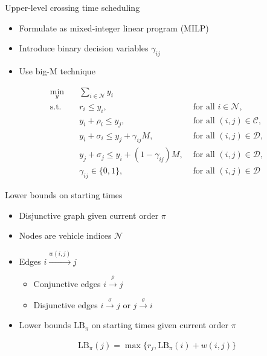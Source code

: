 \documentclass[bigger]{beamer}
\begin{document}
\begin{frame}[label={sec:orgc9e3197}]{Upper-level crossing time scheduling}
\begin{itemize}
\item Formulate as mixed-integer linear program (MILP)
\item Introduce binary decision variables \(\gamma_{ij}\)
\item Use big-M technique
\end{itemize}

\footnotesize
\begin{align*}
  \min_{y} \quad & \sum_{i \in \mathcal{N}} y_{i} & \\
  \text{s.t.} \quad & r_{i} \leq y_{i}, & \text{ for all } i \in \mathcal{N} , \\
  & y_{i} + \rho_{i} \leq y_{j}, & \text{ for all } (i,j) \in \mathcal{C} , \label{eq:conjunctions} \\
  & y_{i} + \sigma_{i} \leq y_{j} + \gamma_{ij}M, & \text{ for all } (i,j) \in {\mathcal{D}} , \\
  & y_{j} + \sigma_{j} \leq y_{i} + (1 - \gamma_{ij})M, & \text{ for all } (i,j) \in {\mathcal{D}} , \\
  & \gamma_{ij} \in \{0, 1\}, & \text{ for all } (i,j) \in {\mathcal{D}} \;
\end{align*}
\end{frame}
\begin{frame}[label={sec:org1ac697d}]{Lower bounds on starting times}
\begin{itemize}
\item Disjunctive graph given current order \(\pi\)
\item Nodes are vehicle indices \(\mathcal{N}\)
\item Edges \(i \xrightarrow{w(i,j)} j\)
\begin{itemize}
\item Conjunctive edges \(i \xrightarrow{\rho} j\)
\item Disjunctive edges \(i \xrightarrow{\sigma} j\) or \(j \xrightarrow{\sigma} i\)
\end{itemize}
\item Lower bounds \(\text{LB}_\pi\) on starting times given current order \(\pi\)
\end{itemize}
\begin{align*}
\text{LB}_\pi(j) = \max\{ r_j, \text{LB}_\pi(i) + w(i,j) \}
\end{align*}
\end{frame}
\end{document}
